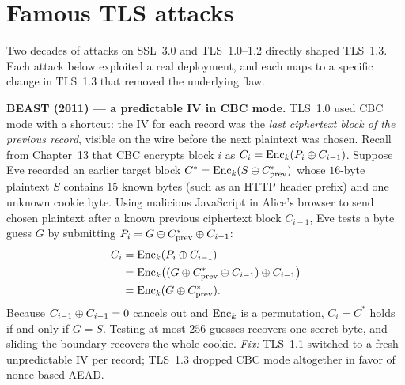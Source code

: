 \section{Famous TLS attacks}

Two decades of attacks on SSL~3.0 and TLS~1.0--1.2 directly shaped TLS~1.3. Each
attack below exploited a real deployment, and each maps to a specific change in
TLS~1.3 that removed the underlying flaw.

\begin{attackbox}
\textbf{BEAST (2011) --- a predictable IV in CBC mode.} TLS~1.0 used CBC mode with a
shortcut: the IV for each record was the \emph{last ciphertext block of the previous
record}, visible on the wire before the next plaintext was chosen. Recall from
Chapter~13 that CBC encrypts block $i$ as $C_i = \operatorname{Enc}_k(P_i \oplus C_{i-1})$. Suppose
Eve recorded an earlier target block $C^* = \operatorname{Enc}_k(S \oplus C^*_{\mathrm{prev}})$
whose $16$-byte plaintext $S$ contains $15$ known bytes (such as an HTTP header
prefix) and one unknown cookie byte. Using malicious JavaScript in Alice's browser
to send chosen plaintext after a known previous ciphertext block $C_{i-1}$, Eve
tests a byte guess $G$ by submitting $P_i = G \oplus C^*_{\mathrm{prev}} \oplus C_{i-1}$:
\begin{align*}
  C_i &= \operatorname{Enc}_k(P_i \oplus C_{i-1}) \\
      &= \operatorname{Enc}_k\bigl((G \oplus C^*_{\mathrm{prev}} \oplus C_{i-1}) \oplus C_{i-1}\bigr) \\
      &= \operatorname{Enc}_k(G \oplus C^*_{\mathrm{prev}}).
\end{align*}
Because $C_{i-1} \oplus C_{i-1} = 0$ cancels out and $\operatorname{Enc}_k$ is a permutation,
$C_i = C^*$ holds if and only if $G = S$. Testing at most $256$ guesses recovers
one secret byte, and sliding the boundary recovers the whole cookie. \emph{Fix:}
TLS~1.1 switched to a fresh unpredictable IV per record; TLS~1.3 dropped CBC mode
altogether in favor of nonce-based AEAD.
\end{attackbox}

